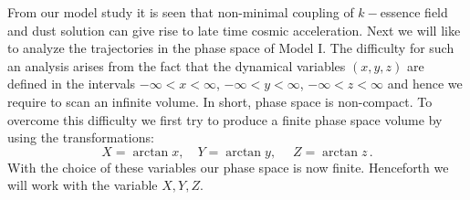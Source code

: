 \documentclass[a4paper,12pt]{article}
\begin{document}
From our model study it is seen that non-minimal coupling of $k-$essence field and dust solution can give rise to late time cosmic acceleration. Next we will like to analyze the trajectories in the phase space of Model I. The difficulty for such an analysis arises from the fact that the dynamical variables $(x,y,z)$ are defined in the intervals $ -\infty<x<\infty $, $ -\infty<y<\infty $, $-\infty<z<\infty$ and hence we require to scan an infinite volume. In short, phase space is non-compact. To overcome this difficulty we first try to produce a finite phase space volume by using the transformations: 
\begin{equation}\label{}
X = \arctan x, \quad  Y =\arctan y, \quad \; Z= \arctan z\,.
\end{equation}
With the choice of these variables our phase space is now finite. Henceforth we will work with the variable $X,Y,Z$.
\end{document}
